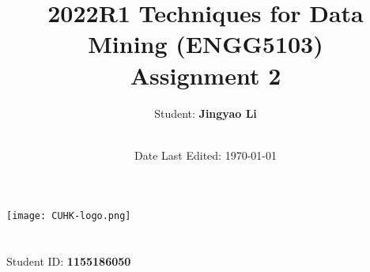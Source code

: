 \title{\Large 2022R1 Techniques for Data Mining (ENGG5103) \\[0.5cm]
        \bf\Large Assignment 2}
\author{\large Student: \bf Jingyao Li\\ \ \\}
\date{\large Date Last Edited: \today}

\makeatletter
    \begin{titlepage}
        \begin{center}
	   { \texttt{[image: CUHK-logo.png]}}
	   {\ \\ \ \\}
        \vbox{}\vspace{5cm}
            {\@title }\\[3cm] 
            {\@author}
            {\large Student ID: \bf 1155186050\\ \ \\}
            {\@date\\}

        \end{center}
    \end{titlepage}
\makeatother
